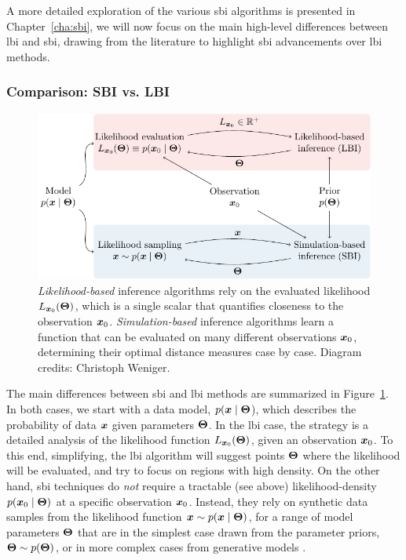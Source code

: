 A more detailed exploration of the various \gls*{sbi} algorithms is presented in Chapter~\ref{cha:sbi}, we will now focus on the main high-level differences between \gls*{lbi} and \gls*{sbi}, drawing from the literature to highlight \gls*{sbi} advancements over \gls*{lbi} methods.


\subsubsection{Comparison: SBI vs. LBI}

\begin{figure}
	\centering
	\includegraphics[width=\linewidth]{TikZ/lbi_vs_sbi.pdf}
	\caption{\emph{Likelihood-based} inference algorithms rely on the evaluated likelihood  $L_{\bm{x}_0}(\bm{\Theta}) $, which is a single scalar that quantifies closeness to the observation $\bm{x}_0$. \emph{Simulation-based} inference algorithms learn a function that can be evaluated on many different observations $\bm{x}_0$, determining their optimal distance measures case by case. Diagram credits: Christoph Weniger.}
	\label{fig:SBIvsLBI}
\end{figure}

The main differences between \gls*{sbi} and \gls*{lbi} methods are summarized in Figure~\ref{fig:SBIvsLBI}. In both cases, we start with a data model, $p(\bm{x}\mid\bm{\Theta}$), which describes the probability of data $\bm{x}$ given parameters $\bm{\Theta}$. In the \gls*{lbi} case, the strategy is a detailed analysis of the likelihood function $L_{\bm{x}_0}(\bm{\Theta})$, given an observation $\bm{x}_0$. To this end, simplifying, the \gls*{lbi} algorithm will suggest points $\bm{\Theta}$ where the likelihood will be evaluated, and try to focus on regions with high density. On the other hand, \gls*{sbi} techniques do \emph{not} require a tractable (see above) likelihood-density $p(\bm{x}_0\mid\bm{\Theta})$ at a specific observation $\bm{x}_0$. Instead, they rely on synthetic data samples from the likelihood function $\bm{x} \sim p(\bm{x}\mid\bm{\Theta})$, for a range of model parameters $\bm{\Theta}$ that are in the simplest case drawn from the parameter priors, $\bm{\Theta} \sim p(\bm{\Theta})$, or in more complex cases from generative models \cite[\eg][]{Karchev:2022aa}. %

